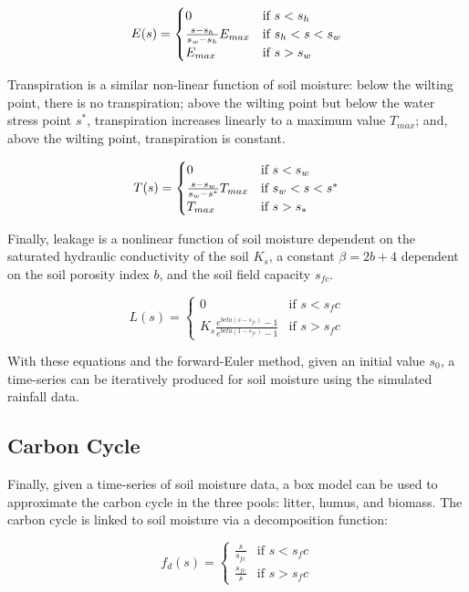 \documentclass[12pt, letterpaper]{article}
\begin{document}
$$ E(s) = \begin{cases}
			0 & \text{if $s < s_h$}\\
            \frac{s - s_h}{s_w - s_h} E_{max} & \text{if $  s_h < s < s_w $}\\
            E_{max} &  \text{if $s > s_w $}
		 \end{cases} $$
		 
Transpiration is a similar non-linear function of soil moisture: below the wilting point, there is no transpiration; above the wilting point but below the water stress point $s^*$, transpiration increases linearly to a maximum value $T_{max}$; and, above the wilting point, transpiration is constant. 

$$ T(s) = \begin{cases}
			0 & \text{if $s < s_w$}\\
            \frac{s - s_w}{s_w - s^*} T_{max} & \text{if $  s_w < s < s^* $}\\
            T_{max} &  \text{if $s > s_* $}
		 \end{cases} $$

Finally, leakage is a nonlinear function of soil moisture dependent on the saturated hydraulic conductivity of the soil $K_s$, a constant $\beta = 2b+4$ dependent on the soil porosity index $b$, and the soil field capacity $s_{fc}$.

$$ L(s) = \begin{cases}
			0 & \text{if $s < s_fc$}\\
            K_s \frac{e^{beta (s - s_{fc})} - 1}{e^{beta (1 - s_{fc})} - 1} &  \text{if $s > s_fc $}
		 \end{cases} $$



With these equations and the forward-Euler method, given an initial value $s_0$, a time-series can be iteratively produced for soil moisture using the simulated rainfall data.


\subsection{Carbon Cycle}
Finally, given a time-series of soil moisture data, a box model can be used to approximate the carbon cycle in the three pools: litter, humus, and biomass. The carbon cycle is linked to soil moisture via a decomposition function:

$$ f_d(s) = \begin{cases}
			\frac{s}{s_{fc}} & \text{if $s < s_fc$}\\
            \frac{s_{fc}}{s} &  \text{if $s > s_fc $}
		    \end{cases} $$
\end{document}
